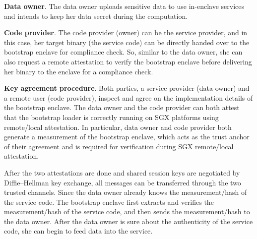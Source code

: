 \vspace{3pt}\noindent\textbf{Data owner}. The data owner uploads sensitive data to use in-enclave services and intends to keep her data secret during the computation. 


\vspace{3pt}\noindent\textbf{Code provider}. The code provider (owner) can be the service provider, and in this case, her target binary (the service code) can be directly handed over to the bootstrap enclave for compliance check. 
So, similar to the data owner, she can also request a  remote attestation to verify the bootstrap enclave before delivering her binary to the enclave for a compliance check. 

\vspace{3pt}\noindent\textbf{Key agreement procedure}.
Both parties, a service provider (data owner) and a remote user (code provider), inspect and agree on the implementation details of the bootstrap enclave. The data owner and the code provider can both attest that the bootstrap loader is correctly running on SGX platforms using remote/local attestation. In particular, data owner and code provider both generate a measurement of the bootstrap enclave, which acts as the trust anchor of their agreement and is required for verification during SGX remote/local attestation.

After the two attestations are done and shared session keys are negotiated by Diffie–Hellman key exchange, all messages can be transferred through the two trusted channels.
Since the data owner already knows the measurement/hash of the service code. The bootstrap enclave first extracts and verifies the measurement/hash of the service code, and then sends the measurement/hash to the data owner. After the data owner is sure about the authenticity of the service code, she can begin to feed data into the service.

